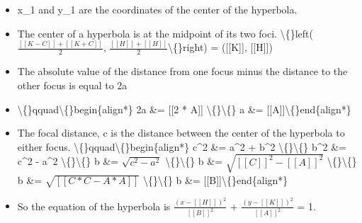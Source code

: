 \documentclass{article}
\begin{document}
\begin{itemize}
  \item x\_1 and y\_1 are the coordinates of the center of the hyperbola.
  \item The center of a hyperbola is at the midpoint of its two foci.
                        \textbackslash\{\}left($\frac{[[K - C]] + [[K + C]]}{2}$, $\frac{[[H]] + [[H]]}{2}$\textbackslash\{\}right) = ([[K]], [[H]])
  \item The absolute value of the distance from one focus minus the distance to the other focus is equal to 2a
  \item \textbackslash\{\}qquad\textbackslash\{\}begin\{align*\}
                            2a \&= [[2 * A]] \textbackslash\{\}\textbackslash\{\}
                            a \&= [[A]]\textbackslash\{\}end\{align*\}
  \item The focal distance, c is the distance between the center of the hyperbola to either focus.
                        \textbackslash\{\}qquad\textbackslash\{\}begin\{align*\}
                            c\textasciicircum{}2 \&= a\textasciicircum{}2 + b\textasciicircum{}2 \textbackslash\{\}\textbackslash\{\}
                            b\textasciicircum{}2 \&= c\textasciicircum{}2 - a\textasciicircum{}2 \textbackslash\{\}\textbackslash\{\}
                            b \&= $\sqrt{c^2 - a^2}$ \textbackslash\{\}\textbackslash\{\}
                            b \&= $\sqrt{[[C]]^2 - [[A]]^2}$ \textbackslash\{\}\textbackslash\{\}
                            b \&= $\sqrt{[[C * C - A * A]]}$ \textbackslash\{\}\textbackslash\{\}
                            b \&= [[B]]\textbackslash\{\}end\{align*\}
  \item So the equation of the hyperbola is
                        $\frac{(x - [[H]])^2}{[[B]]^2}$ + $\frac{(y - [[K]])^2}{[[A]]^2}$ = 1.
\end{itemize}
\end{document}
